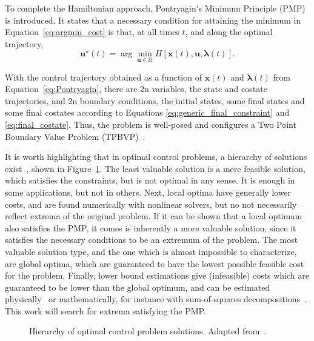 To complete the Hamiltonian approach, Pontryagin's Minimum Principle (PMP) is introduced. It states that a necessary condition for attaining the minimum in Equation~\eqref{eq:argmin_cost} is that, at all times \(t\), and along the optimal trajectory,~\cite{bertsekas}
\begin{equation} \label{eq:Pontryagin}
    \mathbf{u}^\star(t) = \arg \min_{\mathbf{u} \in \mathcal{U}} H[\mathbf{x}(t), \mathbf{u}, \mathbf{\lambda}(t)].
\end{equation}

With the control trajectory obtained as a function of \(\mathbf{x}(t)\) and \(\mathbf{\lambda}(t)\) from Equation~\eqref{eq:Pontryagin}, there are 2n variables, the state and costate trajectories, and 2n boundary conditions, the initial states, some final states and some final costates according to Equations \eqref{eq:generic_final_constraint} and \eqref{eq:final_costate}. Thus, the problem is well-posed and configures a Two Point Boundary Value Problem (TPBVP)~\cite{bryson_applied_optimal_control}.

It is worth highlighting that in optimal control problems, a hierarchy of solutions exist~\cite{ross2015primer}, shown in Figure~\ref{fig:opt_sol_hierarchy}. The least valuable solution is a mere feasible solution, which satisfies the constraints, but is not optimal in any sense. It is enough in some applications, but not in others. Next, local optima have generally lower costs, and are found numerically with nonlinear solvers, but no not necessarily reflect extrema of the original problem. If it can be shown that a local optimum also satisfies the PMP, it comes is inherently a more valuable solution, since it satisfies the necessary conditions to be an extremum of the problem. The most valuable solution type, and the one which is almost impossible to characterize, are global optima, which are guaranteed to have the lowest possible feasible cost for the problem. Finally, lower bound estimations give (infeasible) costs which are guaranteed to be lower than the global optimum, and can be estimated physically~\cite{impulsive_europa} or mathematically, for instance with sum-of-squares decompositions~\cite{sos_book}. This work will search for extrema satisfying the PMP.

\begin{figure}[htbp]
    \centering
    \caption{Hierarchy of optimal control problem solutions. Adapted from~.}
    \label{fig:opt_sol_hierarchy}
\end{figure}


